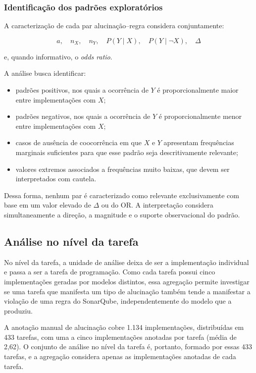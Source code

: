 \subsubsection{Identificação dos padrões exploratórios}

A caracterização de cada par alucinação--regra considera conjuntamente:

\[
a,\quad
n_X,\quad
n_Y,\quad
P(Y\mid X),\quad
P(Y\mid \neg X),\quad
\Delta
\]

e, quando informativo, o \textit{odds ratio}.

A análise busca identificar:

\begin{itemize}
    \item padrões positivos, nos quais a ocorrência de $Y$ é proporcionalmente maior entre implementações com $X$;
    \item padrões negativos, nos quais a ocorrência de $Y$ é proporcionalmente menor entre implementações com $X$;
    \item casos de ausência de coocorrência em que $X$ e $Y$ apresentam frequências marginais suficientes para que esse padrão seja descritivamente relevante;
    \item valores extremos associados a frequências muito baixas, que devem ser interpretados com cautela.
\end{itemize}

Dessa forma, nenhum par é caracterizado como relevante exclusivamente com base em um valor elevado de $\Delta$ ou do OR. A interpretação considera simultaneamente a direção, a magnitude e o suporte observacional do padrão.

\subsection{Análise no nível da tarefa}

No nível da tarefa, a unidade de análise deixa de ser a implementação individual e passa a ser a tarefa de programação. Como cada tarefa possui cinco implementações geradas por modelos distintos, essa agregação permite investigar se uma tarefa que manifesta um tipo de alucinação também tende a manifestar a violação de uma regra do SonarQube, independentemente do modelo que a produziu.

A anotação manual de alucinação cobre 1.134 implementações, distribuídas em 433 tarefas, com uma a cinco implementações anotadas por tarefa (média de 2,62). O conjunto de análise no nível da tarefa é, portanto, formado por essas 433 tarefas, e a agregação considera apenas as implementações anotadas de cada tarefa.

